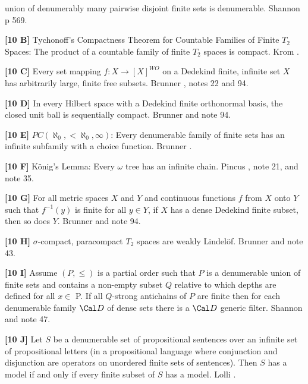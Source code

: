 union of denumerably many pairwise disjoint finite sets is  denumerable.
\ac{Shannon} \cite{1988} p 569.
\smallskip
\item{}{\bf [10 B]}  Tychonoff's Compactness Theorem for Countable
Families of Finite $T_2$ Spaces: The product of a countable family of
finite $T_2$ spaces is compact.  \ac{Krom} \cite{1981}.
\smallskip
\item{}{\bf [10 C]}  Every set mapping $f: X\rightarrow [X]^{WO}$ on a
Dedekind finite, infinite set $X$ has arbitrarily large, finite free
subsets.  \ac{Brunner} \cite{1989}, notes 22 and 94.
\smallskip
\item{}{\bf [10 D]}  In every Hilbert space with a Dedekind finite
orthonormal basis, the closed unit ball is sequentially
compact.  \ac{Brunner} \cite{1983b} and note 94.
\smallskip
\item{}{\bf [10 E]}  $PC(\aleph_{0},< \aleph_{0},\infty)$:  Every
denumerable family of finite  sets  has  an  infinite
subfamily  with  a  choice function.  \ac{Brunner} \cite{1983b}.
\smallskip
\item{}{\bf [10 F]}  K\"onig's Lemma:  Every $\omega$ tree has an
infinite chain.  \ac{Pincus} \cite{1972c}, note 21, and note 35.
\smallskip
\item{}{\bf [10 G]}  For all metric spaces $X$ and $Y$ and continuous
functions $f$ from $X$ onto $Y$ such that $f^{-1}(y)$ is finite for all
$y\in Y$, if $X$ has  a dense Dedekind finite subset, then so does $Y$.
\ac{Brunner} \cite{1982d} and note 94.
\smallskip
\item{}{\bf [10 H]} $\sigma$-compact, paracompact $T_2$ spaces are
weakly Lindel\"of.  \ac{Brunner} \cite{1982b} and note 43.
\smallskip
\item{}{\bf [10 I]}  Assume $(P,\le)$ is a partial order such that $P$
is a denumerable union of finite sets and contains a non-empty subset
$Q$ relative to which depths are defined for all $x\in $ P. If  all
$Q$-strong antichains of $P$ are finite then for each denumerable
family ${\Cal D}$ of dense sets there is a ${\Cal D}$ generic filter.
\ac{Shannon} \cite{1990} and note 47.
\smallskip
\item{}{\bf [10 J]} Let $S$ be a denumerable set of propositional
sentences over an infinite set of propositional letters (in a
propositional language where conjunction and disjunction are operators
on unordered finite sets of sentences).  Then $S$ has a model if and
only if every finite subset of $S$ has a model.  \ac{Lolli} \cite{1977}.
\smallskip
